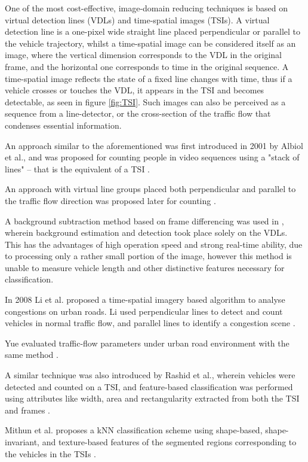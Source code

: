One of the most cost-effective, image-domain reducing techniques is based on virtual detection lines (VDLs) and time-spatial images (TSIs).
A virtual detection line is a one-pixel wide straight line placed perpendicular or parallel to the vehicle trajectory, whilst a time-spatial image can be considered itself as an image, where the vertical dimension corresponds to the VDL in the original frame, and the horizontal one corresponds to time in the original sequence.
A time-spatial image reflects the state of a fixed line changes with time, thus if a vehicle crosses or touches the VDL, it appears in the TSI and becomes detectable, as seen in figure \ref{fig:TSI}.
Such images can also be perceived as a sequence from a line-detector, or the cross-section of the traffic flow that condenses essential information. 

An approach similar to the aforementioned was first introduced in 2001 by Albiol et al., and was proposed for counting people in video sequences using a "stack of lines" -- that is the equivalent of a TSI \cite{Albiol2001}.

An approach with virtual line groups placed both perpendicular and parallel to the traffic flow direction was proposed later for counting \cite{Anan2006,Wu2007}.

A background subtraction method based on frame differencing was used in \cite{Anan2006, Wu2007}, wherein background estimation and detection took place solely on the VDLs.
This has the advantages of high operation speed and strong real-time ability, due to processing only a rather small portion of the image, however this method is unable to measure vehicle length and other distinctive features necessary for classification.

In 2008 Li et al. proposed a time-spatial imagery based algorithm to analyse congestions on urban roads.
Li used perpendicular lines to detect and count vehicles in normal traffic flow, and parallel lines to identify a congestion scene \cite{Li2008}.

Yue evaluated traffic-flow parameters under urban road environment with the same method \cite{Yue2009}.

A similar technique was also introduced by Rashid et al., wherein vehicles were detected and counted on a TSI, and feature-based classification was performed using attributes like width, area and rectangularity extracted from both the TSI and frames \cite{Rashid2010}.

Mithun et al. proposes a kNN classification scheme using shape-based, shape-invariant, and texture-based features of the segmented regions corresponding to the vehicles in the TSIs \cite{Mithun2012a}.

